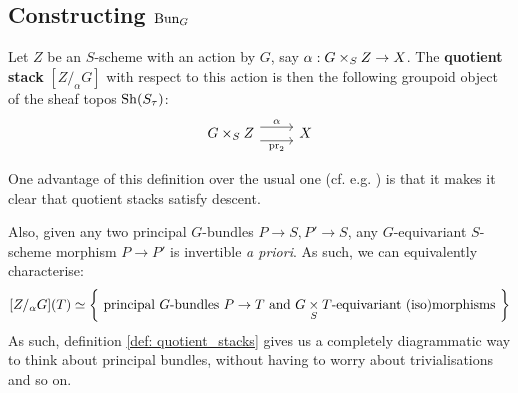     \subsection{Constructing \texorpdfstring{$\mathrm{Bun}_G$}{}}
            \begin{definition} \label{def: quotient_stacks}
                Let $Z$ be an $S$-scheme with an action by $G$, say $\alpha: G \x_S Z \to X$. The \textbf{quotient stack} $[Z/_{\alpha}G]$ with respect to this action is then the following groupoid object of the sheaf topos $\mathrm{Sh}(S_{\tau})$:
                    $$
                        \begin{tikzcd}
                    	{G \x_S Z} & X
                    	\arrow["\alpha", shift left=2, from=1-1, to=1-2]
                    	\arrow["{\pr_2}"', shift right=2, from=1-1, to=1-2]
                        \end{tikzcd}
                    $$
            \end{definition}
            \begin{remark}
                One advantage of this definition over the usual one (cf. e.g. \cite[\href{https://stacks.math.columbia.edu/tag/044O}{Tag 044O}]{stacks}) is that it makes it clear that quotient stacks satisfy descent.
    
                Also, given any two principal $G$-bundles $P \to S, P' \to S$, any $G$-equivariant $S$-scheme morphism $P \to P'$ is invertible \textit{a priori}. As such, we can equivalently characterise:
                    $$[Z/_{\alpha}G](T) \cong \left\{ \text{ principal $G$-bundles $P \to T$ and $G \x_S T$-equivariant (iso)morphisms } \right\}$$
                As such, definition \ref{def: quotient_stacks} gives us a completely diagrammatic way to think about principal bundles, without having to worry about trivialisations and so on. 
            \end{remark}
